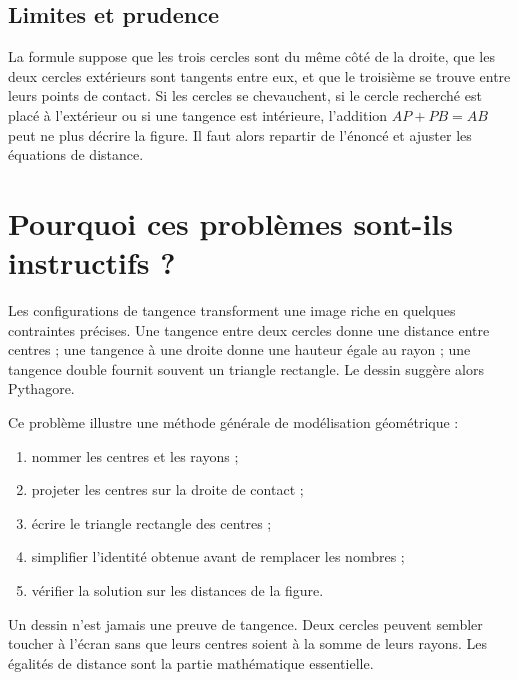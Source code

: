 \subsection{Limites et prudence}
La formule suppose que les trois cercles sont du même côté de la droite, que les deux cercles extérieurs sont tangents entre eux, et que le troisième se trouve entre leurs points de contact. Si les cercles se chevauchent, si le cercle recherché est placé à l'extérieur ou si une tangence est intérieure, l'addition $AP+PB=AB$ peut ne plus décrire la figure. Il faut alors repartir de l'énoncé et ajuster les équations de distance.

\section{Pourquoi ces problèmes sont-ils instructifs ?}
Les configurations de tangence transforment une image riche en quelques contraintes précises. Une tangence entre deux cercles donne une distance entre centres ; une tangence à une droite donne une hauteur égale au rayon ; une tangence double fournit souvent un triangle rectangle. Le dessin suggère alors Pythagore.

Ce problème illustre une méthode générale de modélisation géométrique :
\begin{enumerate}
 \item nommer les centres et les rayons ;
 \item projeter les centres sur la droite de contact ;
 \item écrire le triangle rectangle des centres ;
 \item simplifier l'identité obtenue avant de remplacer les nombres ;
 \item vérifier la solution sur les distances de la figure.
\end{enumerate}

Un dessin n'est jamais une preuve de tangence. Deux cercles peuvent sembler toucher à l'écran sans que leurs centres soient à la somme de leurs rayons. Les égalités de distance sont la partie mathématique essentielle.


